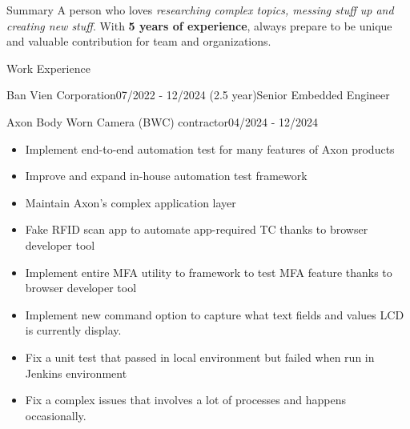 \documentclass{resume} %
\begin{document}
\begin{rSection}{Summary}
 A person who loves\textit{ researching complex topics, messing stuff up and creating new stuff}. With \textbf{5 years of experience}, always prepare to be unique and valuable contribution for team and organizations.
\end{rSection}


\begin{rSection}{Work Experience}
    \begin{rCompanySubsection}{Ban Vien Corporation}{07/2022 - 12/2024 (2.5 year)}{Senior Embedded Engineer}{}{
        \begin{rProjectSubsubsectionV2}{Axon Body Worn Camera (BWC) contractor}{04/2024 - 12/2024}{
            \begin{itemize}
                \item Implement end-to-end automation test for many features of Axon products
                \item Improve and expand in-house automation test framework
                \item Maintain Axon's complex application layer
            \end{itemize}
        }{
            \begin{itemize}
                \item Fake RFID scan app to automate app-required TC thanks to browser developer tool
                \item Implement entire MFA utility to framework to test MFA feature thanks to browser developer tool
                \item Implement new command option to capture what text fields and values LCD is currently display.
                \item Fix a unit test that passed in local environment but failed when run in Jenkins environment
                \item Fix a complex issues that involves a lot of processes and happens occasionally.
            \end{itemize}
        }
        \end{rProjectSubsubsectionV2}

}
\end{rCompanySubsection}
\end{rSection}
\end{document}
